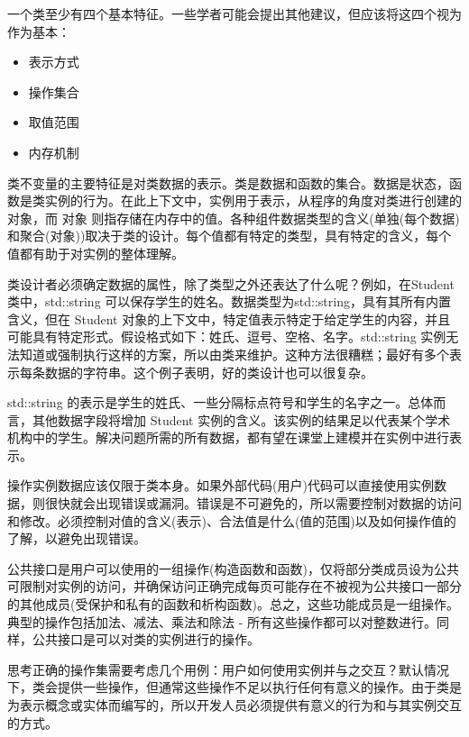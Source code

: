
一个类至少有四个基本特征。一些学者可能会提出其他建议，但应该将这四个视为作为基本：

\begin{itemize}
\item
表示方式

\item
操作集合

\item
取值范围

\item
内存机制
\end{itemize}


类不变量的主要特征是对类数据的表示。类是数据和函数的集合。数据是状态，函数是类实例的行为。在此上下文中，实例用于表示，从程序的角度对类进行创建的对象，而 对象 则指存储在内存中的值。各种组件数据类型的含义(单独(每个数据)和聚合(对象))取决于类的设计。每个值都有特定的类型，具有特定的含义，每个值都有助于对实例的整体理解。

类设计者必须确定数据的属性，除了类型之外还表达了什么呢？例如，在Student 类中，std::string 可以保存学生的姓名。数据类型为std::string，具有其所有内置含义，但在 Student 对象的上下文中，特定值表示特定于给定学生的内容，并且可能具有特定形式。假设格式如下：姓氏、逗号、空格、名字。std::string 实例无法知道或强制执行这样的方案，所以由类来维护。这种方法很糟糕；最好有多个表示每条数据的字符串。这个例子表明，好的类设计也可以很复杂。

std::string 的表示是学生的姓氏、一些分隔标点符号和学生的名字之一。总体而言，其他数据字段将增加 Student 实例的含义。该实例的结果足以代表某个学术机构中的学生。解决问题所需的所有数据，都有望在课堂上建模并在实例中进行表示。


操作实例数据应该仅限于类本身。如果外部代码(用户)代码可以直接使用实例数据，则很快就会出现错误或漏洞。错误是不可避免的，所以需要控制对数据的访问和修改。必须控制对值的含义(表示)、合法值是什么(值的范围)以及如何操作值的了解，以避免出现错误。

公共接口是用户可以使用的一组操作(构造函数和函数)，仅将部分类成员设为公共可限制对实例的访问，并确保访问正确完成每页可能存在不被视为公共接口一部分的其他成员(受保护和私有的函数和析构函数)。总之，这些功能成员是一组操作。典型的操作包括加法、减法、乘法和除法 - 所有这些操作都可以对整数进行。同样，公共接口是可以对类的实例进行的操作。

思考正确的操作集需要考虑几个用例：用户如何使用实例并与之交互？默认情况下，类会提供一些操作，但通常这些操作不足以执行任何有意义的操作。由于类是为表示概念或实体而编写的，所以开发人员必须提供有意义的行为和与其实例交互的方式。

